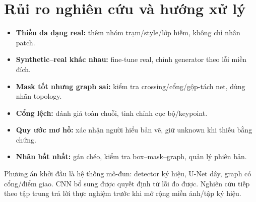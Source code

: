 \documentclass[11pt,a4paper]{article}
\begin{document}
\section{Rủi ro nghiên cứu và hướng xử lý}
\begin{itemize}
  \item \textbf{Thiếu đa dạng real:} thêm nhóm trạm/style/lớp hiếm, không chỉ nhân patch.
  \item \textbf{Synthetic--real khác nhau:} fine-tune real, chỉnh generator theo lỗi miền đích.
  \item \textbf{Mask tốt nhưng graph sai:} kiểm tra crossing/cổng/gộp-tách net, dùng nhãn topology.
  \item \textbf{Cổng lệch:} đánh giá toàn chuỗi, tinh chỉnh cục bộ/keypoint.
  \item \textbf{Quy ước mơ hồ:} xác nhận người hiểu bản vẽ, giữ unknown khi thiếu bằng chứng.
  \item \textbf{Nhãn bất nhất:} gán chéo, kiểm tra box--mask--graph, quản lý phiên bản.
\end{itemize}
Phương án khởi đầu là hệ thống mô-đun: detector ký hiệu, U-Net dây, graph có cổng/điểm giao. CNN bổ sung được quyết định từ lỗi đo được. Nghiên cứu tiếp theo tập trung trả lời thực nghiệm trước khi mở rộng miền ảnh/tập ký hiệu.
\end{document}

